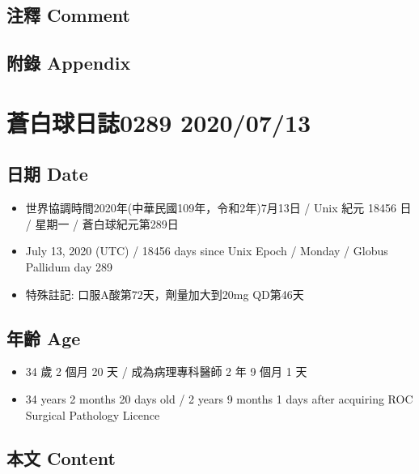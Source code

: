 \documentclass[
]{article}
\providecommand{\tightlist}{%
  \setlength{\itemsep}{0pt}\setlength{\parskip}{0pt}}
\begin{document}
\hypertarget{ux6ce8ux91cb-comment-11}{%
\subsection{注釋 Comment}\label{ux6ce8ux91cb-comment-11}}

\hypertarget{ux9644ux9304-appendix-11}{%
\subsection{附錄 Appendix}\label{ux9644ux9304-appendix-11}}

\hypertarget{ux84bcux767dux7403ux65e5ux8a8c0289-20200713}{%
\section{蒼白球日誌0289
2020/07/13}\label{ux84bcux767dux7403ux65e5ux8a8c0289-20200713}}

\hypertarget{ux65e5ux671f-date-12}{%
\subsection{日期 Date}\label{ux65e5ux671f-date-12}}

\begin{itemize}
\tightlist
\item
  世界協調時間2020年(中華民國109年，令和2年)7月13日 / Unix 紀元 18456 日
  / 星期一 / 蒼白球紀元第289日
\item
  July 13, 2020 (UTC) / 18456 days since Unix Epoch / Monday / Globus
  Pallidum day 289
\item
  特殊註記: 口服A酸第72天，劑量加大到20mg QD第46天
\end{itemize}

\hypertarget{ux5e74ux9f61-age-12}{%
\subsection{年齡 Age}\label{ux5e74ux9f61-age-12}}

\begin{itemize}
\tightlist
\item
  34 歲 2 個月 20 天 / 成為病理專科醫師 2 年 9 個月 1 天
\item
  34 years 2 months 20 days old / 2 years 9 months 1 days after
  acquiring ROC Surgical Pathology Licence
\end{itemize}

\hypertarget{ux672cux6587-content-12}{%
\subsection{本文 Content}\label{ux672cux6587-content-12}}
\end{document}
